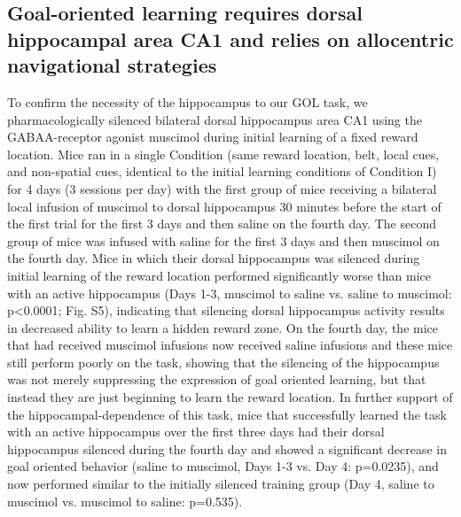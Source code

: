 \subsection{Goal-oriented learning requires dorsal hippocampal area CA1 and relies on allocentric navigational strategies}

To confirm the necessity of the hippocampus to our GOL task, we pharmacologically silenced bilateral dorsal hippocampus area CA1 using the GABAA-receptor agonist muscimol during initial learning of a fixed reward location. Mice ran in a single Condition (same reward location, belt, local cues, and non-spatial cues, identical to the initial learning conditions of Condition I) for 4 days (3 sessions per day) with the first group of mice receiving a bilateral local infusion of muscimol to dorsal hippocampus 30 minutes before the start of the first trial for the first 3 days and then saline on the fourth day. The second group of mice was infused with saline for the first 3 days and then muscimol on the fourth day. Mice in which their dorsal hippocampus was silenced during initial learning of the reward location performed significantly worse than mice with an active hippocampus (Days 1-3, muscimol to saline vs. saline to muscimol: p<0.0001; Fig. S5), indicating that silencing dorsal hippocampus activity results in decreased ability to learn a hidden reward zone. On the fourth day, the mice that had received muscimol infusions now received saline infusions and these mice still perform poorly on the task, showing that the silencing of the hippocampus was not merely suppressing the expression of goal oriented learning, but that instead they are just beginning to learn the reward location. In further support of the hippocampal-dependence of this task, mice that successfully learned the task with an active hippocampus over the first three days had their dorsal hippocampus silenced during the fourth day and showed a significant decrease in goal oriented behavior (saline to muscimol, Days 1-3 vs. Day 4: p=0.0235), and now performed similar to the initially silenced training group (Day 4, saline to muscimol vs. muscimol to saline: p=0.535).

